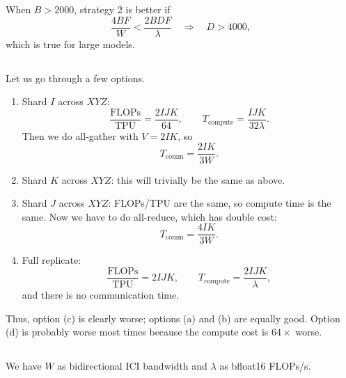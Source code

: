 \documentclass[11pt]{article}
\newcommand{\B}{B}
\newcommand{\D}{D}
\newcommand{\F}{F}
\newcommand{\W}{W}
\newcommand{\lam}{\lambda}
\newcommand{\exercisebreak}{\Needspace{8\baselineskip}}
\begin{document}
When $\B>2000$, strategy 2 is better if
\[
  \frac{4\B\F}{\W}<\frac{2\B\D\F}{\lam}
  \quad\Longrightarrow\quad
  \D>4000,
\]
which is true for large models.

\exercisebreak
\subsection{}
Let us go through a few options.

\begin{enumerate}[label=(\alph*)]
  \item Shard $I$ across $XYZ$:
  \[
    \frac{\mathrm{FLOPs}}{\mathrm{TPU}}=\frac{2IJK}{64},
    \qquad
    T_{\mathrm{compute}}=\frac{IJK}{32\lam}.
  \]
  Then we do all-gather with $V=2IK$, so
  \[
    T_{\mathrm{comm}}=\frac{2IK}{3\W}.
  \]

  \item Shard $K$ across $XYZ$: this will trivially be the same as above.

  \item Shard $J$ across $XYZ$: FLOPs/TPU are the same, so compute time is the same. Now we have to do all-reduce, which has double cost:
  \[
    T_{\mathrm{comm}}=\frac{4IK}{3\W}.
  \]

  \item Full replicate:
  \[
    \frac{\mathrm{FLOPs}}{\mathrm{TPU}}=2IJK,
    \qquad
    T_{\mathrm{compute}}=\frac{2IJK}{\lam},
  \]
  and there is no communication time.
\end{enumerate}

Thus, option (c) is clearly worse; options (a) and (b) are equally good. Option (d) is probably worse most times because the compute cost is $64\times$ worse.

\exercisebreak
\subsection{}
We have $\W$ as bidirectional ICI bandwidth and $\lam$ as bfloat16 FLOPs/s.
\end{document}
